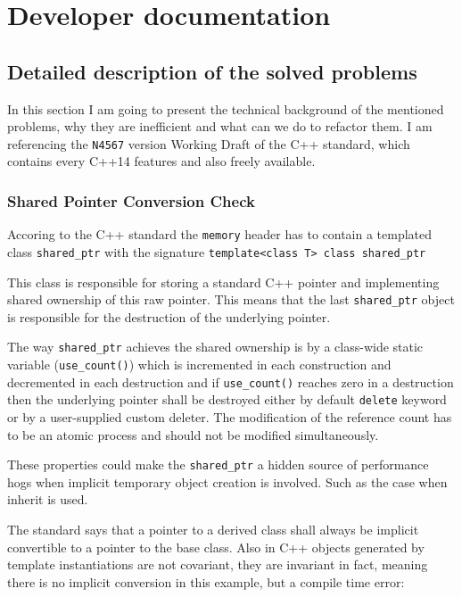 \section{Developer documentation}
\subsection{Detailed description of the solved problems}
\par In this section I am going to present the technical background of the mentioned problems, why they are inefficient and what can we do to refactor them. I am referencing the \verb|N4567|\cite{cpp_standard} version Working Draft of the C++ standard, which contains every C++14 features and also freely available. 
\subsubsection{Shared Pointer Conversion Check}
\par Accoring to the C++ standard the \verb|memory| header has to contain a templated class \verb|shared_ptr| with the signature \verb|template<class T> class shared_ptr|\cite[\S20.8.2.2]{cpp_standard} \medskip
\par This class is responsible for storing a standard C++ pointer and implementing shared ownership of this raw pointer. This means that the last \verb|shared_ptr| object is responsible for the destruction of the underlying pointer. \medskip
\par The way \verb|shared_ptr| achieves the shared ownership is by a class-wide static variable (\verb|use_count()|) which is incremented in each construction and decremented in each destruction and if \verb|use_count()|  reaches zero in a destruction then the underlying pointer shall be destroyed either by default \verb|delete| keyword or by a user-supplied custom deleter. The modification of the reference count has to be an atomic process and should not be modified simultaneously\cite[\S20.8.2.2 4.]{cpp_standard}. \medskip
\par These properties could make the \verb|shared_ptr| a hidden source of performance hogs when implicit temporary object creation is involved.  Such as the case when inherit is used. \medskip
\par The standard says that a pointer to a derived class shall always be implicit convertible to a pointer to the base class\cite[\S4.10 3.]{cpp_standard}. Also in C++ objects generated  by template instantiations are not covariant, they are invariant in fact, meaning there is no implicit conversion in this example, but a compile time error:
